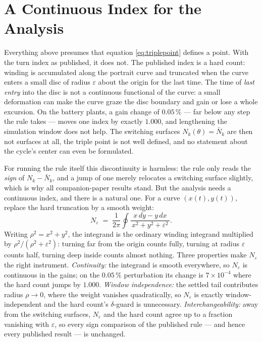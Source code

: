\documentclass[letterpaper, 10pt, conference, twocolumn]{ieeeconf}
\newcommand{\Nbar}{\bar{N}}
\newcommand{\Neps}{N_{\varepsilon}}
\begin{document}
\section{A Continuous Index for the Analysis}
\label{sec:index}

Everything above presumes that equation \eqref{eq:triplepoint} defines a
point. With the turn index as published, it does not. The published index is a
hard count: winding is accumulated along the portrait curve and truncated when
the curve enters a small disc of radius $\varepsilon$ about the origin for the
last time. The time of \emph{last entry} into the disc is not a continuous
functional of the curve: a small deformation can make the curve graze the disc
boundary and gain or lose a whole excursion. On the battery plants, a gain
change of $0.05\,\%$ --- far below any step the rule takes --- moves one index
by exactly $1.000$, and lengthening the simulation window does not help. The
switching surfaces $N_k(\theta) = \Nbar_k$ are then not surfaces at all, the
triple point is not well defined, and no statement about the cycle's center
can even be formulated.

For running the rule itself this discontinuity is harmless: the rule only
reads the \emph{sign} of $N_k - \Nbar_k$, and a jump of one merely relocates a
switching surface slightly, which is why all companion-paper results stand.
But the analysis needs a continuous index, and there is a natural one. For a
curve $(x(t), y(t))$, replace the hard truncation by a smooth weight:
\begin{equation}
\Neps \;=\; \frac{1}{2\pi} \oint
\frac{x\,dy - y\,dx}{\,x^2 + y^2 + \varepsilon^2\,}.
\label{eq:neps}
\end{equation}
Writing $\rho^2 = x^2 + y^2$, the integrand is the ordinary winding integrand
multiplied by $\rho^2 / (\rho^2 + \varepsilon^2)$: turning far from the origin
counts fully, turning at radius $\varepsilon$ counts half, turning deep inside
counts almost nothing. Three properties make $\Neps$ the right instrument.
\emph{Continuity:} the integrand is smooth everywhere, so $\Neps$ is
continuous in the gains; on the $0.05\,\%$ perturbation its change is
$7 \times 10^{-4}$ where the hard count jumps by $1.000$. \emph{Window
independence:} the settled tail contributes radius $\rho \to 0$, where the
weight vanishes quadratically, so $\Neps$ is exactly window-independent and
the hard count's $\delta$-guard is unnecessary. \emph{Interchangeability:}
away from the switching surfaces, $\Neps$ and the hard count agree up to a
fraction vanishing with $\varepsilon$, so every sign comparison of the
published rule --- and hence every published result --- is unchanged.
\end{document}
